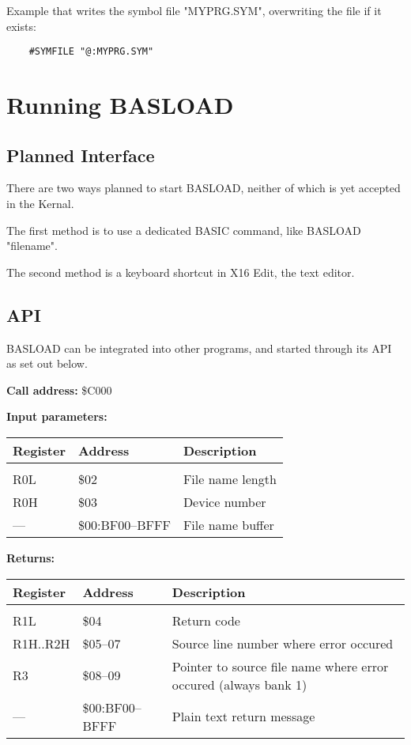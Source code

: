 \documentclass{article}
\begin{document}
        Example that writes the symbol file "MYPRG.SYM", overwriting the
        file if it exists:
        \begin{verbatim}
    #SYMFILE "@:MYPRG.SYM"
        \end{verbatim}

\section{Running BASLOAD}

    \subsection{Planned Interface}

        There are two ways planned to start BASLOAD, neither of which is yet
        accepted in the Kernal.

        The first method is to use a dedicated BASIC command, like BASLOAD "filename".

        The second method is a keyboard shortcut in X16 Edit, the text editor.

    \subsection{API}

        BASLOAD can be integrated into other programs, and started through its
        API as set out below.

        \vspace{1em}
        \textbf{Call address:} \$C000

        \textbf{Input parameters:} 

        \begin{longtable}[l]{l l p{6cm}}
            \textbf{Register} & \textbf{Address} & \textbf{Description} \\
	        \hline \\
            R0L & \$02            & File name length \\
            R0H & \$03            & Device number \\
            ---  & \$00:BF00--BFFF & File name buffer \\
        \end{longtable}
        \vspace{-1.5em}
        \textbf{Returns:} 

        \begin{longtable}[l]{l l p{6cm}}
            \textbf{Register} & \textbf{Address} & \textbf{Description} \\
	        \hline \\
            R1L      & \$04       & Return code \\
            R1H..R2H & \$05--07   & Source line number where error occured \\
            R3       & \$08--09   & Pointer to source file name where error occured (always bank 1) \\
            ---      & \$00:BF00--BFFF & Plain text return message \\
        \end{longtable}
\end{document}
